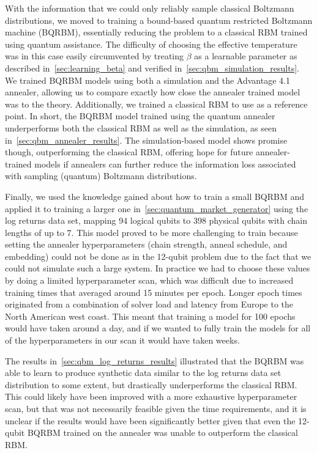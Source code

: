 With the information that we could only reliably sample classical Boltzmann distributions, we moved to training a bound-based quantum restricted Boltzmann machine (BQRBM), essentially reducing the problem to a classical RBM trained using quantum assistance.
The difficulty of choosing the effective temperature was in this case easily circumvented by treating \( \beta \) as a learnable parameter as described in~\cref{sec:learning_beta} and verified in~\cref{sec:qbm_simulation_results}.
We trained BQRBM models using both a simulation and the Advantage 4.1 annealer, allowing us to compare exactly how close the annealer trained model was to the theory.
Additionally, we trained a classical RBM to use as a reference point.
In short, the BQRBM model trained using the quantum annealer underperforms both the classical RBM as well as the simulation, as seen in~\cref{sec:qbm_annealer_results}.
The simulation-based model shows promise though, outperforming the classical RBM, offering hope for future annealer-trained models if annealers can further reduce the information loss associated with sampling (quantum) Boltzmann distributions.

Finally, we used the knowledge gained about how to train a small BQRBM and applied it to training a larger one in~\cref{sec:quantum_market_generator} using the log returns data set, mapping 94 logical qubits to 398 physical qubits with chain lengths of up to 7.
This model proved to be more challenging to train because setting the annealer hyperparameters (chain strength, anneal schedule, and embedding) could not be done as in the 12-qubit problem due to the fact that we could not simulate such a large system.
In practice we had to choose these values by doing a limited hyperparameter scan, which was difficult due to increased training times that averaged around 15 minutes per epoch.
Longer epoch times originated from a combination of solver load and latency from Europe to the North American west coast.
This meant that training a model for 100 epochs would have taken around a day, and if we wanted to fully train the models for all of the hyperparameters in our scan it would have taken weeks.

The results in~\cref{sec:qbm_log_returns_results} illustrated that the BQRBM was able to learn to produce synthetic data similar to the log returns data set distribution to some extent, but drastically underperforms the classical RBM.
This could likely have been improved with a more exhaustive hyperparameter scan, but that was not necessarily feasible given the time requirements, and it is unclear if the results would have been significantly better given that even the 12-qubit BQRBM trained on the annealer was unable to outperform the classical RBM.

